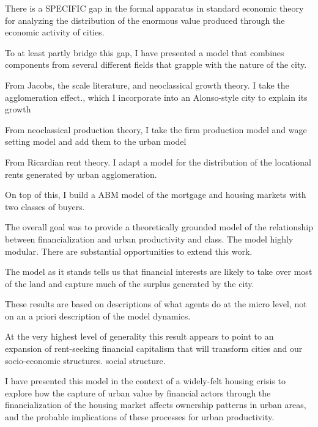 \documentclass[]{article}
\begin{document}
There is a SPECIFIC gap in the formal apparatus in standard economic theory for analyzing the distribution of the enormous value produced through the economic activity of cities.

To at least partly bridge this gap, I have presented a model that combines components from several different fields that grapple with the nature of the city.

From Jacobs, the scale literature, and neoclassical growth theory. I take the agglomeration effect., which I incorporate into an Alonso-style city to explain its growth

From neoclassical production theory, I take the firm production model and wage setting model and add them to the urban model

From Ricardian rent theory. I adapt a model for the distribution of the locational rents generated by urban agglomeration.

On top of this, I build a ABM model of the mortgage and housing markets with two classes of buyers.

The overall goal was to provide a theoretically grounded model of the relationship between financialization and urban productivity and class.
The model highly modular. There are substantial opportunities to extend this work.


The model as it stands tells us that financial interests are likely to take over most of the land and capture much of the surplus generated by the city.

These results are based on descriptions of what agents do at the micro level, not on an a priori description of the model dynamics.

At the very highest level of generality this result appears to point to an expansion of rent-seeking financial capitalism that will transform cities and our socio-economic structures. social structure.

I have presented this model in the context of a widely-felt housing crisis to explore how the capture of urban value by financial actors through the financialization of the housing market affects ownership patterns in urban areas, and the probable implications of these processes for urban productivity.
\end{document}
